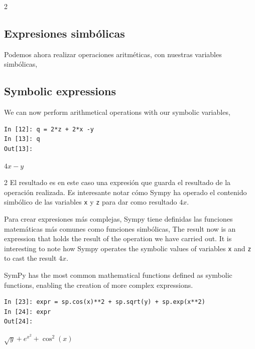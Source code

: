 \begin{paracol}{2}
\subsection{Expresiones simbólicas}
Podemos ahora realizar operaciones aritméticas, con nuestras variables simbólicas,
\switchcolumn
\subsection{Symbolic expressions}
We can now perform arithmetical operations with our symbolic variables,
\end{paracol}
\begin{center}
\begin{minipage}{.5\textwidth}
	\begin{verbatim}
In [12]: q = 2*z + 2*x -y
In [13]: q
Out[13]: 			
	\end{verbatim}
	$4x - y$
\end{minipage}
\end{center}

\begin{paracol}{2}
El resultado es en este caso una expresión que guarda el resultado de la operación realizada. Es interesante notar cómo Sympy ha operado el contenido simbólico de las variables \texttt{x} y \texttt{z} para dar como resultado $4x$.

Para crear expresiones más complejas, Sympy tiene definidas las funciones matemáticas más comunes como funciones simbólicas,
\switchcolumn
The result now is an expression that holds the result of the operation we have carried out. It is interesting to note how Sympy operates the symbolic values of variables \texttt{x} and \texttt{z} to cast the result $4x$. 

SymPy has the most common mathematical functions defined as symbolic functions, enabling the creation of more complex expressions.
\end{paracol}

\begin{center}
\begin{minipage}{.8\textwidth}
	\begin{verbatim}
In [23]: expr = sp.cos(x)**2 + sp.sqrt(y) + sp.exp(x**2)
In [24]: expr
Out[24]: 			
	\end{verbatim}
	$\sqrt{y}+e^{x^2}+\cos^2(x)$
\end{minipage}
\end{center}

